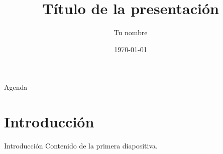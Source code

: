 \documentclass{beamer}
\title{Título de la presentación}
\author{Tu nombre}
\date{\today}
\begin{document}
\frame{\titlepage}

\begin{frame}{Agenda}
  \tableofcontents
\end{frame}

\section{Introducción}
\begin{frame}{Introducción}
  Contenido de la primera diapositiva.
\end{frame}
\end{document}
